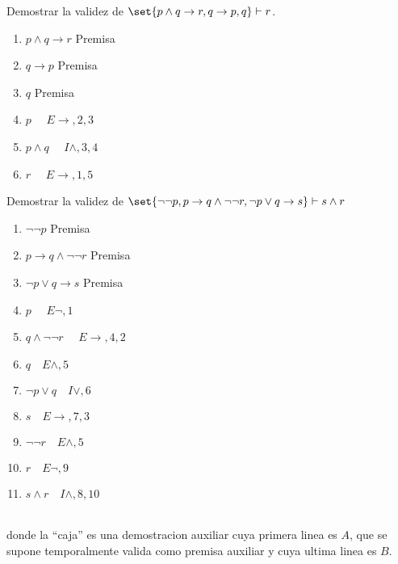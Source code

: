 \begin{example}
	Demostrar la validez de \(\set{p \wedge q \rightarrow r, q\rightarrow p, q } \vdash r \).

	\begin{enumerate}
		\item \(p \wedge  q \rightarrow r \) Premisa
		\item \(q \rightarrow p \) Premisa
		\item \(q \) Premisa
		\item \(p \) \(\quad E\rightarrow,2,3 \)
		\item \(p \wedge  q \) \(\quad I\wedge ,3,4\)
		\item \(r \) \(\quad E\rightarrow,1,5\)
	\end{enumerate}
\end{example}
\begin{example}
	Demostrar la validez de \(\set{\neg \neg p, p\rightarrow q \wedge \neg \neg r, \neg p \vee q \rightarrow s }\vdash s \wedge  r \)
	\begin{enumerate}
		\item \(\neg \neg p \) Premisa
		\item \(p \rightarrow q \wedge \neg \neg r \) Premisa
		\item \(\neg p \vee q \rightarrow s \) Premisa
		\item \(p \) \(\quad E\neg, 1 \)
		\item \(q \wedge  \neg \neg r \) \(\quad E\rightarrow,4,2\)
		\item \(q \quad E\wedge, 5 \)
		\item \(\neg p \vee q \quad I\vee,6 \)
		\item \(s \quad E\rightarrow,7,3\)
		\item \(\neg \neg r \quad E\wedge ,5\)
		\item \(r \quad E\neg,9 \)
		\item \(s \wedge  r \quad I\wedge ,8,10\)
	\end{enumerate}
\end{example}

\begin{definition}
	~\\

	donde la ``caja'' es una demostracion auxiliar cuya primera linea es \(A \), que se supone temporalmente valida como premisa auxiliar y cuya ultima linea es \(B \).
\end{definition}

